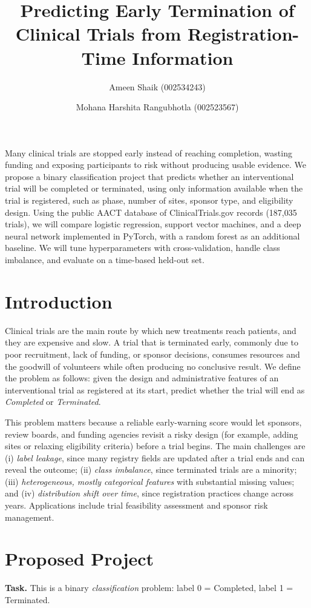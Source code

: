 \documentclass[12pt]{article}
\title{Predicting Early Termination of Clinical Trials from Registration-Time Information}
\author{Ameen Shaik (002534243) \and Mohana Harshita Rangubhotla (002523567)}
\date{}
\begin{document}
\maketitle

\abstract
Many clinical trials are stopped early instead of reaching completion, wasting funding and exposing participants to risk without producing usable evidence. We propose a binary classification project that predicts whether an interventional trial will be completed or terminated, using only information available when the trial is registered, such as phase, number of sites, sponsor type, and eligibility design. Using the public AACT database of ClinicalTrials.gov records (187,035 trials), we will compare logistic regression, support vector machines, and a deep neural network implemented in PyTorch, with a random forest as an additional baseline. We will tune hyperparameters with cross-validation, handle class imbalance, and evaluate on a time-based held-out set.

\section{Introduction}
Clinical trials are the main route by which new treatments reach patients, and they are expensive and slow. A trial that is terminated early, commonly due to poor recruitment, lack of funding, or sponsor decisions, consumes resources and the goodwill of volunteers while often producing no conclusive result. We define the problem as follows: given the design and administrative features of an interventional trial as registered at its start, predict whether the trial will end as \emph{Completed} or \emph{Terminated}.

This problem matters because a reliable early-warning score would let sponsors, review boards, and funding agencies revisit a risky design (for example, adding sites or relaxing eligibility criteria) before a trial begins. The main challenges are (i) \emph{label leakage}, since many registry fields are updated after a trial ends and can reveal the outcome; (ii) \emph{class imbalance}, since terminated trials are a minority; (iii) \emph{heterogeneous, mostly categorical features} with substantial missing values; and (iv) \emph{distribution shift over time}, since registration practices change across years. Applications include trial feasibility assessment and sponsor risk management.

\section{Proposed Project}
\textbf{Task.} This is a binary \emph{classification} problem: label 0 = Completed, label 1 = Terminated.
\end{document}
